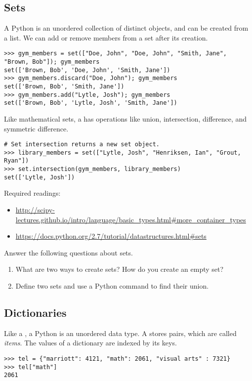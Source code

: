 \subsection*{Sets}
A Python  is an unordered collection of distinct objects, and can be created from a list. We can add or remove members from a set after its creation.
\begin{lstlisting}
>>> gym_members = set(["Doe, John", "Doe, John", "Smith, Jane", "Brown, Bob"]); gym_members
set(['Brown, Bob', 'Doe, John', 'Smith, Jane'])
>>> gym_members.discard("Doe, John"); gym_members
set(['Brown, Bob', 'Smith, Jane'])
>>> gym_members.add("Lytle, Josh"); gym_members
set(['Brown, Bob', 'Lytle, Josh', 'Smith, Jane'])
\end{lstlisting}

Like mathematical sets, a  has operations like union, intersection, 
difference, and symmetric difference.

\begin{lstlisting}
# Set intersection returns a new set object.
>>> library_members = set(["Lytle, Josh", "Henriksen, Ian", "Grout, Ryan"])
>>> set.intersection(gym_members, library_members)
set(['Lytle, Josh'])
\end{lstlisting}

Required readings: 
\begin{itemize}
\item \url{http://scipy-lectures.github.io/intro/language/basic_types.html#more_container_types}
\item \url{https://docs.python.org/2.7/tutorial/datastructures.html#sets}
\end{itemize}

\begin{problem}
Answer the following questions about sets.
\begin{enumerate}
\item What are two ways to create sets? How do you create an empty set?
\item Define two sets and use a Python command to find their union.
\end{enumerate}
\end{problem}

\subsection*{Dictionaries}
Like a , a Python  is an unordered data type.  A  stores  pairs, which are called \emph{items}. The values of a dictionary are indexed by its keys.
\begin{lstlisting}
>>> tel = {"marriott": 4121, "math": 2061, "visual arts" : 7321} 
>>> tel["math"]
2061
\end{lstlisting}

